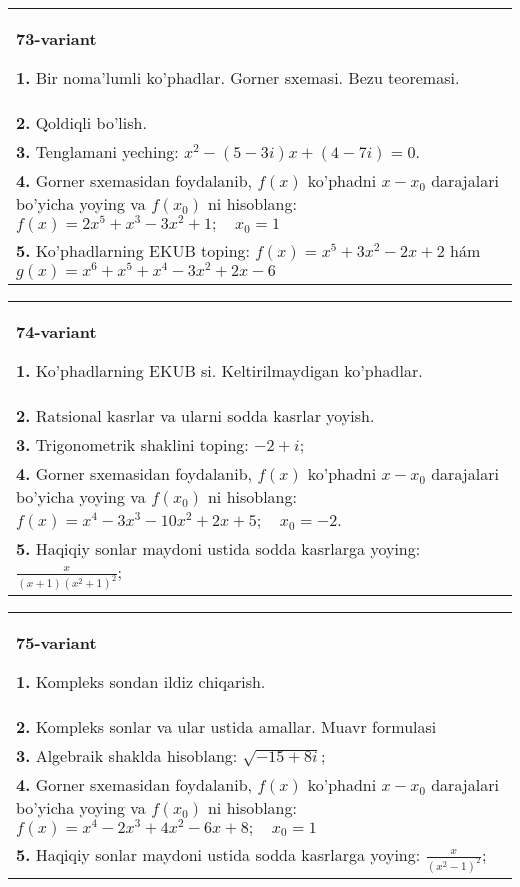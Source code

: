 \documentclass{article}
\begin{document}
\begin{tabular}{m{17cm}}
\textbf{73-variant}
\newline

\textbf{1.} Bir noma’lumli ko’phadlar. Gorner sxemasi. Bezu teoremasi.  \\
\textbf{2.} Qoldiqli bo’lish.  \\
\textbf{3.} Tenglamani yeching:  $x^2-(5-3 i) x+(4-7 i)=0$. \\
\textbf{4.} Gorner sxemasidan foydalanib, $f(x)$ ko’phadni $x-x_0$ darajalari bo’yicha yoying va $f\left(x_0\right)$ ni hisoblang:  $f(x)=2 x^5+x^3-3 x^2+1 ; \quad x_0=1$ \\
\textbf{5.} Ko’phadlarning EKUB toping:  $f(x)=x^5+3 x^2-2 x+2$ hám $g(x)=x^6+x^5+x^4-3 x^2+2 x-6$ \\

\end{tabular}
\vspace{1cm}


\begin{tabular}{m{17cm}}
\textbf{74-variant}
\newline

\textbf{1.} Ko’phadlarning EKUB si. Keltirilmaydigan ko’phadlar. \\
\textbf{2.} Ratsional kasrlar va ularni sodda kasrlar yoyish. \\
\textbf{3.} Trigonometrik shaklini toping: $-2+i$; \\
\textbf{4.} Gorner sxemasidan foydalanib, $f(x)$ ko’phadni $x-x_0$ darajalari bo’yicha yoying va $f\left(x_0\right)$ ni hisoblang: $f(x)=x^4-3 x^3-10 x^2+2 x+5 ; \quad x_0=-2$. \\
\textbf{5.} Haqiqiy sonlar maydoni ustida sodda kasrlarga yoying:  $\frac{x}{(x+1)\left(x^2+1\right)^2}$; \\

\end{tabular}
\vspace{1cm}


\begin{tabular}{m{17cm}}
\textbf{75-variant}
\newline

\textbf{1.} Kompleks sondan ildiz chiqarish. \\
\textbf{2.} Kompleks sonlar va ular ustida amallar. Muavr formulasi  \\
\textbf{3.} Algebraik shaklda hisoblang: $\sqrt{-15+8 i}$; \\
\textbf{4.} Gorner sxemasidan foydalanib, $f(x)$ ko’phadni $x-x_0$ darajalari bo’yicha yoying va $f\left(x_0\right)$ ni hisoblang: $f(x)=x^4-2 x^3+4 x^2-6 x+8 ; \quad x_0=1$ \\
\textbf{5.} Haqiqiy sonlar maydoni ustida sodda kasrlarga yoying:  $\frac{x}{\left(x^2-1\right)^2}$; \\

\end{tabular}
\vspace{1cm}
\end{document}
